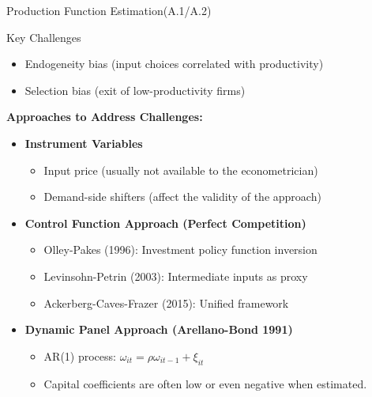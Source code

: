 \documentclass[aspectratio=169]{beamer}  %
\begin{document}
\begin{frame}{Production Function Estimation(A.1/A.2)}
    \begin{alertblock}{Key Challenges}
        \begin{itemize}
            \item Endogeneity bias (input choices correlated with productivity)
            \item Selection bias (exit of low-productivity firms)
        \end{itemize}
    \end{alertblock}


\textbf{Approaches to Address Challenges:}
    \begin{itemize}
        \item \textbf{Instrument Variables}
        \begin{itemize}
            \item Input price (usually not available to the econometrician)
            \item Demand-side shifters (affect the validity of the approach)
        \end{itemize}

        \item \textbf{Control Function Approach (Perfect Competition)}
        \begin{itemize}
            \item Olley-Pakes (1996): Investment policy function inversion
            \item Levinsohn-Petrin (2003): Intermediate inputs as proxy
            \item Ackerberg-Caves-Frazer (2015): Unified framework
        \end{itemize}

        \item \textbf{Dynamic Panel Approach (Arellano-Bond 1991)}
        \begin{itemize}
            \item AR(1) process: $\omega_{it} = \rho\omega_{it-1} + \xi_{it}$
            \item Capital coefficients are often low or even negative when estimated.
        \end{itemize}
    \end{itemize}
\end{frame}
\end{document}
